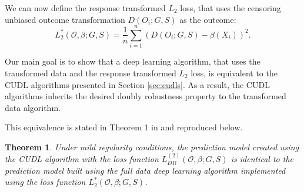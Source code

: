 \documentclass[12pt, a4paper]{scrartcl}
\theoremstyle{definition}
\theoremstyle{plain}
\newtheorem{Theorem}{Theorem}[section]
\numberwithin{equation}{section}
\numberwithin{figure}{section}
\numberwithin{table}{section}
\begin{document}
	We can now define the response transformed $L_2$ loss, that uses the censoring unbiased outcome transformation $D(O_i;G,S)$ as the outcome:
	\begin{equation*}
	L_2^*(\mathcal{O}, \beta; G,S) = \frac{1}{n} \sum_{i=1}^n (D(O_i;G,S)-\beta(X_i))^2.
	\end{equation*}
	
	Our main goal is to show that a deep learning algorithm, that uses the transformed data and the response transformed $L_2$ loss, is equivalent to the CUDL algorithms presented in Section \ref{sec:cudls}.
	As a result, the CUDL algorithms inherits the desired doubly robustness property to the transformed data algorithm.
	
	This equivalence is stated in Theorem 1 in \citet*{basearticle} and reproduced below.
	
	\begin{Theorem}\label{thm:equi}
		Under mild regularity conditions, the prediction model created using the CUDL algorithm with the loss function $L_{DR}^{(2)}(\mathcal{O}, \beta; G,S)$ is identical to the prediction model built using the full data deep learning algorithm implemented using the loss function $L_2^*(\mathcal{O}, \beta; G,S)$.
	\end{Theorem}
	
\end{document}
